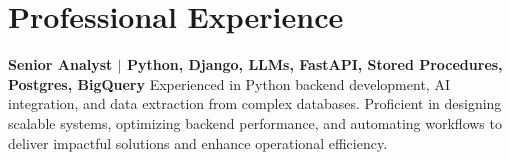 \section{Professional Experience}
\textbf{Senior Analyst \(|\) Python, Django, LLMs, FastAPI, Stored Procedures, Postgres, BigQuery}
Experienced in Python backend development, AI integration, and data extraction from complex databases. Proficient in designing scalable systems, optimizing backend performance, and automating workflows to deliver impactful solutions and enhance operational efficiency.
